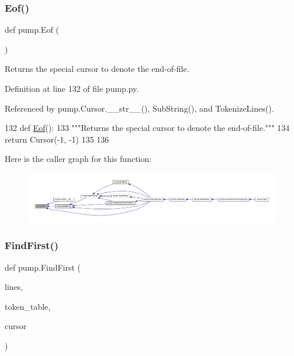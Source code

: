 \subsubsection{\texorpdfstring{Eof()}{Eof()}}
{\footnotesize\ttfamily def pump.\+Eof (\begin{DoxyParamCaption}{ }\end{DoxyParamCaption})}

\begin{DoxyVerb}Returns the special cursor to denote the end-of-file.\end{DoxyVerb}
 

Definition at line 132 of file pump.\+py.



Referenced by pump.\+Cursor.\+\_\+\+\_\+str\+\_\+\+\_\+(), Sub\+String(), and Tokenize\+Lines().


\begin{DoxyCode}
132 \textcolor{keyword}{def }\hyperlink{namespacepump_a38844b22bd5a51c098b07c2c36c5c5b3}{Eof}():
133   \textcolor{stringliteral}{"""Returns the special cursor to denote the end-of-file."""}
134   \textcolor{keywordflow}{return} Cursor(-1, -1)
135 
136 
\end{DoxyCode}
Here is the caller graph for this function\+:
\nopagebreak
\begin{figure}[H]
\begin{center}
\leavevmode
\includegraphics[width=350pt]{namespacepump_a38844b22bd5a51c098b07c2c36c5c5b3_icgraph}
\end{center}
\end{figure}
\mbox{\label{namespacepump_a08f2d05c192d11a134c008287bafef07}} 
\subsubsection{\texorpdfstring{Find\+First()}{FindFirst()}}
{\footnotesize\ttfamily def pump.\+Find\+First (\begin{DoxyParamCaption}\item[{}]{lines,  }\item[{}]{token\+\_\+table,  }\item[{}]{cursor }\end{DoxyParamCaption})}

